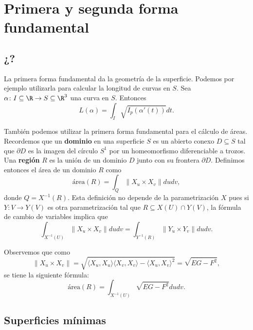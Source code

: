 \chapter{Primera y segunda forma fundamental}

\section{¿?}
La primera forma fundamental da la geometría de la superficie. Podemos por
ejemplo utilizarla para calcular la longitud de curvas en $S$. Sea
$\alpha\colon I\subseteq\R\to S\subseteq\R^3$ una curva en $S$. Entonces
\[
	L(\alpha)=\int_I\sqrt{I_p(\alpha'(t))}dt.
\]

También podemos utilizar la primera forma fundamental para el cálculo de áreas.
Recordemos que un \textbf{dominio} en una superficie $S$ es un abierto conexo
$D\subseteq S$ tal que $\partial D$ es la imagen del círculo $S^1$ por un
homeomorfismo diferenciable a trozos. Una \textbf{región} $R$ es la unión de un
dominio $D$ junto con su frontera $\partial D$. Definimos entonces
el área de un dominio $R$ como
\[
	\text{área}(R)=\int_Q\|X_u\times X_v\|dudv,
\]
donde $Q=X^{-1}(R)$. Esta definición no depende de la parametrización $X$ pues
si $Y\colon V\to Y(V)$ es otra parametrización tal que $R\subseteq X(U)\cap Y(V)$, 
la fórmula de cambio de variables implica que
\[
	\int_{X^{-1}(U)}\|X_u\times X_v\|dudv=\int_{Y^{-1}(R)}\|Y_u\times Y_v\|dudv.
\]

Observemos que como
\[
	\|X_u\times X_v\|=\sqrt{\langle X_u,X_u\rangle\langle X_v,X_v\rangle-\langle X_u,X_v\rangle^2}=\sqrt{EG-F^2},
\]
se tiene la siguiente fórmula:
\[
	\text{área}(R)=\int_{X^{-1}(U)}\sqrt{EG-F^2}dudv.
\]




\section{Superficies mínimas}



